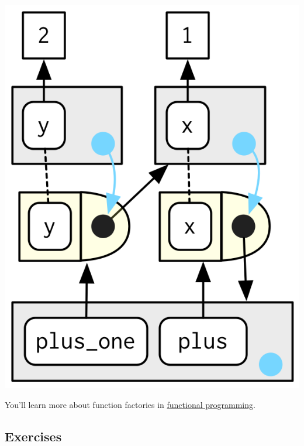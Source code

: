 \documentclass[]{book}
\theoremstyle{definition}
\theoremstyle{definition}
\theoremstyle{definition}
\theoremstyle{remark}
\begin{document}
\begin{center}\includegraphics{diagrams/environments/closure-call} \end{center}

You'll learn more about function factories in
\protect\hyperlink{functional-programming}{functional programming}.

\subsection{Exercises}\label{exercises-8}
\end{document}
